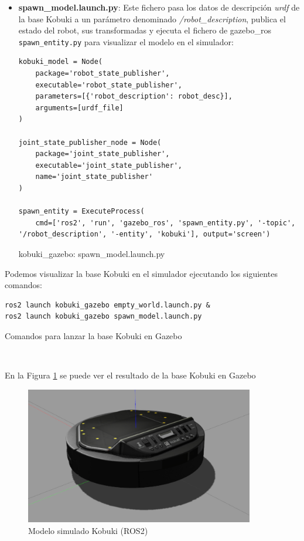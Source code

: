 \begin{itemize}
	\item \textbf{spawn\_model.launch.py}: Este fichero pasa los datos de descripción \textit{urdf} de la base Kobuki a un parámetro denominado \textit{/robot\_description}, publica el estado del robot, sus transformadas y ejecuta el fichero de gazebo\_ros \texttt{spawn\_entity.py} para visualizar el modelo en el simulador:
	
\begin{code}[H]
\begin{lstlisting}[frame=single]
kobuki_model = Node(
	package='robot_state_publisher',
	executable='robot_state_publisher',
	parameters=[{'robot_description': robot_desc}],
	arguments=[urdf_file]
)

joint_state_publisher_node = Node(
	package='joint_state_publisher',
	executable='joint_state_publisher',
	name='joint_state_publisher'
)

spawn_entity = ExecuteProcess(
	cmd=['ros2', 'run', 'gazebo_ros', 'spawn_entity.py', '-topic', '/robot_description', '-entity', 'kobuki'], output='screen')
\end{lstlisting}
\caption[kobuki\_gazebo: spawn\_model.launch.py]{kobuki\_gazebo: spawn\_model.launch.py}
\label{cod:kobuki_gazebo_spawn_model}
\end{code}
\end{itemize}

Podemos visualizar la base Kobuki en el simulador ejecutando los siguientes comandos:\\

\begin{code}[H]
\begin{lstlisting}
ros2 launch kobuki_gazebo empty_world.launch.py &
ros2 launch kobuki_gazebo spawn_model.launch.py
\end{lstlisting}
\caption{Comandos para lanzar la base Kobuki en Gazebo}
\label{cod:comandos_kobuki_launch}
\end{code}\

En la Figura \ref{fig:sim_kobuki_base} se puede ver el resultado de la base Kobuki en Gazebo
\begin{figure} [H]
  \begin{center}
    \includegraphics[width=10cm]{imagenes/cap4/sim_kobuki_base.png}
  \end{center}
  \caption[Modelo simulado Kobuki (ROS2)]{Modelo simulado Kobuki (ROS2)}
  \label{fig:sim_kobuki_base}
\end{figure}\



